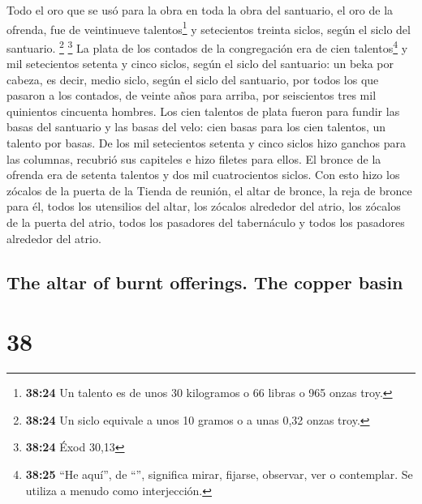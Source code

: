 \begin{paracol}{2}
 Todo el oro que se usó para la obra en toda la obra del
santuario, el oro de la ofrenda, fue de veintinueve talentos\footnote{\textbf{38:24}
  Un talento es de unos 30 kilogramos o 66 libras o 965 onzas troy.} y
setecientos treinta siclos, según el siclo del santuario. \footnote{\textbf{38:24}
  Un siclo equivale a unos 10 gramos o a unas 0,32 onzas troy.}
\footnote{\textbf{38:24} Éxod 30,13}  La plata de los
contados de la congregación era de cien talentos\footnote{\textbf{38:25}
  ``He aquí'', de ``'', significa mirar, fijarse, observar,
  ver o contemplar. Se utiliza a menudo como interjección.} y mil
setecientos setenta y cinco siclos, según el siclo del santuario:
 un beka por cabeza, es decir, medio siclo, según el
siclo del santuario, por todos los que pasaron a los contados, de veinte
años para arriba, por seiscientos tres mil quinientos cincuenta hombres.
 Los cien talentos de plata fueron para fundir las basas
del santuario y las basas del velo: cien basas para los cien talentos,
un talento por basas.  De los mil setecientos setenta y
cinco siclos hizo ganchos para las columnas, recubrió sus capiteles e
hizo filetes para ellos.  El bronce de la ofrenda era de
setenta talentos y dos mil cuatrocientos siclos.  Con
esto hizo los zócalos de la puerta de la Tienda de reunión, el altar de
bronce, la reja de bronce para él, todos los utensilios del altar,
 los zócalos alrededor del atrio, los zócalos de la
puerta del atrio, todos los pasadores del tabernáculo y todos los
pasadores alrededor del atrio.

\switchcolumn
\begin{otherlanguage}{english}

\hypertarget{the-altar-of-burnt-offerings.-the-copper-basin}{%
\subsection{The altar of burnt offerings. The copper
basin}\label{the-altar-of-burnt-offerings.-the-copper-basin}}

\hypertarget{section-75}{%
\section{38}\label{section-75}}


\end{otherlanguage}
\end{paracol}
